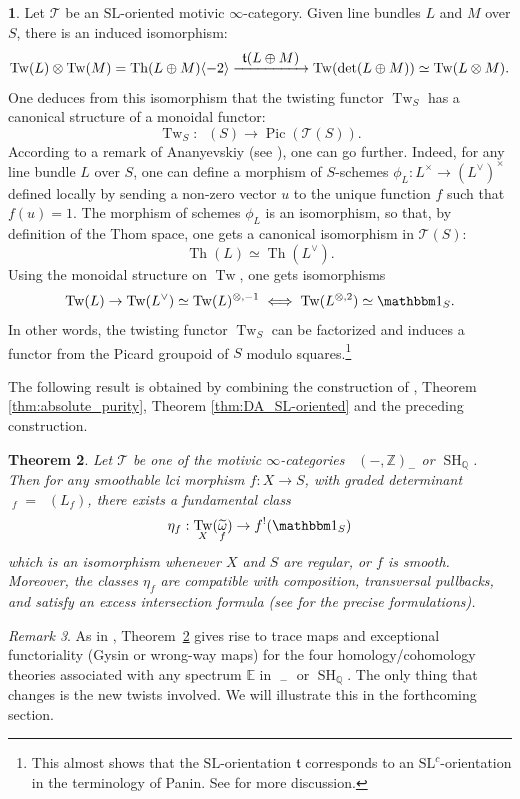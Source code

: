 \documentclass[JEP,XML,SOM,Unicode]{cedram}
\def\To#1{\mathchoice{\xrightarrow{\textstyle\kern4pt#1\kern3pt}}{\stackrel{#1}{\longrightarrow}}{}{}}
\newcommand{\T}{\mathscr T}
\DeclareMathOperator{\uPic}{\underline{Pic}}
\renewcommand{\AA}{\mathbb A}
\newcommand{\E}{\mathbb E}
\newcommand{\un}{\mathbbm 1}
\newcommand{\SL}{\mathrm{SL}}
\newcommand{\thom}{\mathfrak t}
\DeclareMathOperator{\SH}{SH}
\DeclareMathOperator{\DA}{D_{\AA^1}}
\DeclareMathOperator{\Pic}{Pic}
\newcommand{\twist}[1]{\langle #1 \rangle}
\DeclareMathOperator{\Th}{Th}
\DeclareMathOperator{\Tw}{Tw}
\DeclareMathOperator{\tdet}{\widetilde \det}
\DeclareMathOperator{\tomega}{\widetilde \omega}
\newcommand{\ZZ} {\mathbb Z}
\newcommand{\QQ} {\mathbb Q}
\newtheorem{thm}{Theorem}[section]
\theoremstyle{remark}
\newtheorem{rem}[thm]{Remark}
\theoremstyle{definition}
\newtheorem{num}[thm]{}
\numberwithin{equation}{thm}
\begin{document}
\begin{num}
Let $\T$ be an $\SL$-oriented motivic $\infty$-category.
Given line bundles $L$ and $M$ over $S$, there is an induced isomorphism:
\[
\Tw(L) \otimes \Tw(M)=\Th(L \oplus M)\twist{-2}
\To{\thom(L \oplus M)} \Tw(\det(L \oplus M))\simeq \Tw(L \otimes M).
\]
One deduces from this isomorphism that the twisting functor $\Tw_S$ has
a canonical structure of a monoidal functor:
\[
\Tw_S:\uPic(S) \to \Pic(\T(S)).
\]
According to a remark of Ananyevskiy (see \cite[Lem.\,4.1]{AnaSL}),
one can go further.
Indeed, for any line bundle $L$ over $S$,
one can define a morphism of $S$-schemes
\hbox{$\phi_L:L^\times \to (L^\vee)^\times$} defined locally by sending a non-zero vector $u$
to the unique function $f$ such that $f(u)=1$.
The morphism of schemes $\phi_L$ is an isomorphism, so that, by definition of the Thom space, one gets
a canonical isomorphism in $\T(S)$:
\[
\Th(L) \simeq \Th(L^\vee).
\]
Using the monoidal structure on $\Tw$,
one gets isomorphisms
\[
\Tw(L) \to \Tw(L^\vee) \simeq \Tw(L)^{\otimes,-1}
\iff
\Tw(L^{\otimes,2}) \simeq \un_S.
\]
In other words, the twisting functor $\Tw_S$ can be factorized and induces a functor from the Picard groupoid
of $S$ modulo squares.\footnote{This almost shows that the $\SL$-orientation $\thom$ corresponds to an $\SL^c$-orientation
in the terminology of Panin. See \cite[Rem.\,4.4]{AnaSL} for more discussion.}
\end{num}

The following result is obtained by combining the construction of \cite{DJK},
Theorem \ref{thm:absolute_purity}, Theorem \ref{thm:DA_SL-oriented} and the preceding
construction.
\begin{thm}\label{thm:SLoriented_absolute_purity}
Let $\T$ be one of the motivic $\infty$-categories $\DA(-,\ZZ)_-$ or $\SH_\QQ$.
Then for any smoothable lci morphism $f:X \to S$,
with graded determinant $\tomega_f=\tdet(L_f)$,
there exists a fundamental class
\[
\eta_f:\Tw_X(\tomega_f) \to f^!(\un_S)
\]
which is an isomorphism whenever $X$ and $S$ are regular, or $f$ is smooth.
Moreover, the classes $\eta_f$ are compatible with composition, transversal pullbacks, and satisfy an excess intersection formula (see \cite{DJK} for the precise formulations).
\end{thm}

\begin{rem}
As in \cite{DJK}, Theorem~\ref{thm:SLoriented_absolute_purity} gives rise to trace maps and exceptional functoriality (Gysin or wrong-way maps) for the four homology/cohomology theories associated with any spectrum $\E$ in $\DA_-$ or $\SH_\QQ$.
The only thing that changes is the new twists involved.
We will illustrate this in the forthcoming section.
\end{rem}
\end{document}
